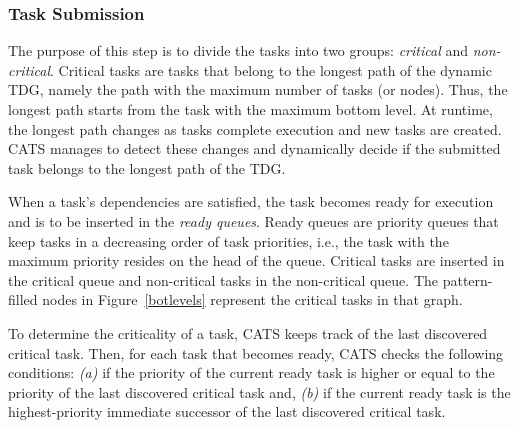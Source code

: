 \subsubsection{Task Submission}


The purpose of this step is to divide the tasks into two groups: \textit{critical} and \textit{non-critical}. Critical tasks are tasks that belong to the longest path of the dynamic TDG, namely the path  with the maximum number of tasks (or nodes). Thus, the longest path starts from the task with the maximum bottom level. At runtime, the longest path changes as tasks complete execution and new tasks are created. CATS manages to detect these changes and dynamically decide if the submitted task belongs to the longest path of the TDG.

When a task's dependencies are satisfied, the task becomes ready for execution and is to be inserted in the \textit{ready queues}. Ready queues are priority queues that keep tasks in a decreasing order of task priorities, i.e., the task with the maximum priority resides on the head of the queue. Critical tasks are inserted in the critical queue and non-critical tasks in the non-critical queue. The pattern-filled nodes in Figure~\ref{botlevels} represent the critical tasks in that graph. 


To determine the criticality of a task, CATS keeps track of the last discovered critical task. Then, for each task that becomes ready, CATS checks the following conditions:
\textit{(a)} if the priority of the current ready task is higher or equal to the priority of the last discovered critical task and, \textit{(b)} if the current ready task is the highest-priority immediate successor of the last discovered critical task.

